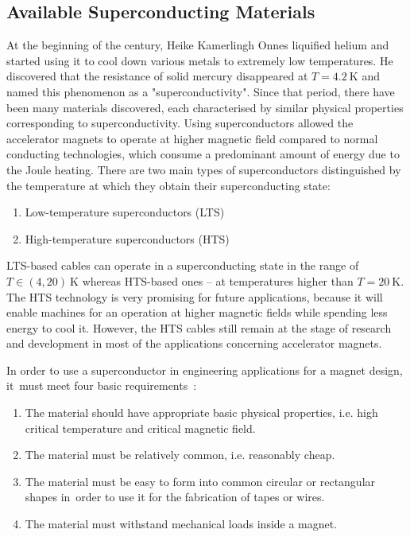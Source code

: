 
\subsection{Available Superconducting Materials}

At the beginning of the  century, Heike Kamerlingh Onnes liquified helium and started using it to cool down various metals to extremely low temperatures. He discovered that the resistance of solid mercury disappeared at $T=4.2~\text{K}$ and named this phenomenon as a "superconductivity". Since that period, there have been many materials discovered, each characterised by similar physical properties corresponding to superconductivity. Using superconductors allowed the accelerator magnets to operate at higher magnetic field compared to normal conducting technologies, which consume a predominant amount of energy due to the Joule heating. There are two main types of superconductors distinguished by the temperature at which they obtain their superconducting state: 
\begin{enumerate}
    \item Low-temperature superconductors (LTS)
    \item High-temperature superconductors (HTS)
\end{enumerate}
LTS-based cables can operate in a superconducting state in the range of $T \in (4, 20)~\text{K}$ whereas HTS-based ones -- at temperatures higher than $T=20~\text{K}$. The HTS technology is very promising for future applications, because it will enable machines for an operation at higher magnetic fields while spending less energy to cool it. However, the HTS cables still remain at the stage of research and development in most of the applications concerning accelerator magnets. ~\cite[p.~77-95]{evans_marvel_of_technology}

In order to use a superconductor in engineering applications for a magnet design, it~must meet four basic requirements~\cite[p.~77-95]{evans_marvel_of_technology}:

\begin{enumerate}
    \item The material should have appropriate basic physical properties, i.e. high critical temperature and critical magnetic field.
    \item The material must be relatively common, i.e. reasonably cheap.
    \item The material must be easy to form into common circular or rectangular shapes in~order to use it for the fabrication of tapes or wires.
    \item The material must withstand mechanical loads inside a magnet.
\end{enumerate}

